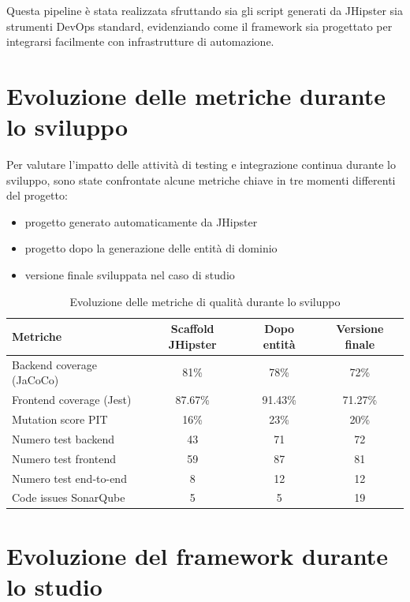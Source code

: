 Questa pipeline è stata realizzata sfruttando sia gli script generati da JHipster sia strumenti DevOps standard, evidenziando come il framework sia progettato per integrarsi facilmente con infrastrutture di automazione.

\section{Evoluzione delle metriche durante lo sviluppo}
\label{sec:evaluation-metrics}

Per valutare l'impatto delle attività di testing e integrazione continua durante lo sviluppo, sono state confrontate alcune metriche chiave in tre momenti differenti del progetto:

\begin{itemize}
	\item progetto generato automaticamente da JHipster
	\item progetto dopo la generazione delle entità di dominio
	\item versione finale sviluppata nel caso di studio
\end{itemize}
\begin{center}
	
\begin{table}[H]
	\centering
	\caption{Evoluzione delle metriche di qualità durante lo sviluppo}
	\label{tab:quality-evolution}
	\begin{tabular}{lccc}
		\hline
		Metriche & Scaffold JHipster & Dopo entità & Versione finale \\
		\hline
		Backend coverage (JaCoCo) & 81\% & 78\% & 72\% \\
		Frontend coverage (Jest) & 87.67\% & 91.43\% & 71.27\% \\
		Mutation score PIT & 16\% & 23\% & 20\% \\
		Numero test backend & 43 & 71 & 72 \\
		Numero test frontend & 59 & 87 & 81 \\
		Numero test end-to-end & 8 & 12 & 12 \\
		Code issues SonarQube & 5 & 5 & 19 \\
		\hline
	\end{tabular}
\end{table}
\end{center}

\section{Evoluzione del framework durante lo studio}

